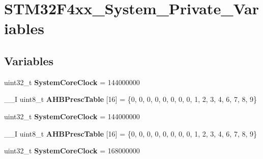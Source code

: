 \hypertarget{group___s_t_m32_f4xx___system___private___variables}{\section{S\-T\-M32\-F4xx\-\_\-\-System\-\_\-\-Private\-\_\-\-Variables}
\label{group___s_t_m32_f4xx___system___private___variables}
}
\subsection*{Variables}
\begin{DoxyCompactItemize}
\item 
\hypertarget{group___s_t_m32_f4xx___system___private___variables_gaa3cd3e43291e81e795d642b79b6088e6}{uint32\-\_\-t {\bfseries System\-Core\-Clock} = 144000000}\label{group___s_t_m32_f4xx___system___private___variables_gaa3cd3e43291e81e795d642b79b6088e6}

\item 
\hypertarget{group___s_t_m32_f4xx___system___private___variables_gacdc3ef54c0704c90e69a8a84fb2d970d}{\-\_\-\-\_\-\-I uint8\-\_\-t {\bfseries A\-H\-B\-Presc\-Table} \mbox{[}16\mbox{]} = \{0, 0, 0, 0, 0, 0, 0, 0, 1, 2, 3, 4, 6, 7, 8, 9\}}\label{group___s_t_m32_f4xx___system___private___variables_gacdc3ef54c0704c90e69a8a84fb2d970d}

\item 
\hypertarget{group___s_t_m32_f4xx___system___private___variables_gaa3cd3e43291e81e795d642b79b6088e6}{uint32\-\_\-t {\bfseries System\-Core\-Clock} = 144000000}\label{group___s_t_m32_f4xx___system___private___variables_gaa3cd3e43291e81e795d642b79b6088e6}

\item 
\hypertarget{group___s_t_m32_f4xx___system___private___variables_gacdc3ef54c0704c90e69a8a84fb2d970d}{\-\_\-\-\_\-\-I uint8\-\_\-t {\bfseries A\-H\-B\-Presc\-Table} \mbox{[}16\mbox{]} = \{0, 0, 0, 0, 0, 0, 0, 0, 1, 2, 3, 4, 6, 7, 8, 9\}}\label{group___s_t_m32_f4xx___system___private___variables_gacdc3ef54c0704c90e69a8a84fb2d970d}

\item 
\hypertarget{group___s_t_m32_f4xx___system___private___variables_gaa3cd3e43291e81e795d642b79b6088e6}{uint32\-\_\-t {\bfseries System\-Core\-Clock} = 168000000}\label{group___s_t_m32_f4xx___system___private___variables_gaa3cd3e43291e81e795d642b79b6088e6}


\end{DoxyCompactItemize}
